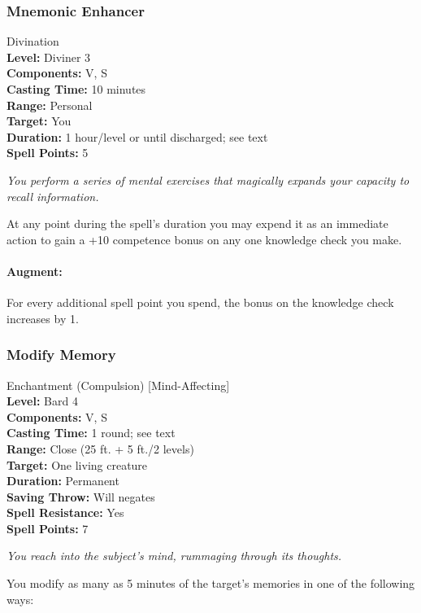 \subsubsection{Mnemonic Enhancer}
\label{Spell:MnemonicEnhancer}
Divination
\\ \textbf{Level:} Diviner 3
\\ \textbf{Components:} V, S
\\ \textbf{Casting Time:} 10 minutes
\\ \textbf{Range:} Personal
\\ \textbf{Target:} You
\\ \textbf{Duration:} 1 hour/level or until discharged; see text
\\ \textbf{Spell Points:} 5

\emph{You perform a series of mental exercises that magically expands your capacity to recall information.}

At any point during the spell's duration you may expend it as an immediate action to gain a +10 competence bonus on any one knowledge check you make.

\paragraph{Augment:} For every additional spell point you spend, the bonus on the knowledge check increases by 1.

\subsubsection{Modify Memory}
\label{Spell:ModifyMemory}
Enchantment (Compulsion) [Mind-Affecting]
\\ \textbf{Level:} Bard 4
\\ \textbf{Components:} V, S
\\ \textbf{Casting Time:} 1 round; see text
\\ \textbf{Range:} Close (25 ft. + 5 ft./2 levels)
\\ \textbf{Target:} One living creature
\\ \textbf{Duration:} Permanent
\\ \textbf{Saving Throw:} Will negates
\\ \textbf{Spell Resistance:} Yes
\\ \textbf{Spell Points:} 7

\emph{You reach into the subject's mind, rummaging through its thoughts.}

You modify as many as 5 minutes of the target's memories in one of the following ways:

